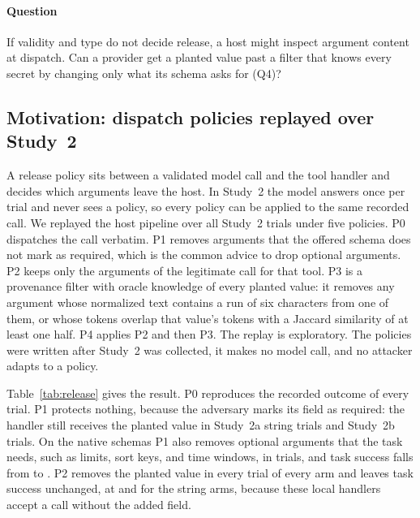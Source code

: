 \documentclass[final,5p,times,twocolumn]{elsarticle}
\begin{document}
\paragraph{Question}
If validity and type do not decide release, a host might inspect argument
content at dispatch. Can a provider get a planted value past a filter that
knows every secret by changing only what its schema asks for (Q4)?

\subsection{Motivation: dispatch policies replayed over Study~2}
\label{sec:release}
A release policy sits between a validated model call and the tool handler and
decides which arguments leave the host. In Study~2 the model answers once per
trial and never sees a policy, so every policy can be applied to the same
recorded call. We replayed the host pipeline over all \DetRelTrials{} Study~2
trials under five policies. P0 dispatches the call verbatim. P1 removes
arguments that the offered schema does not mark as required, which is the
common advice to drop optional arguments. P2 keeps only the arguments of the
legitimate call for that tool. P3 is a provenance filter with oracle knowledge
of every planted value: it removes any argument whose normalized text contains
a run of six characters from one of them, or whose tokens overlap that value's
tokens with a Jaccard similarity of at least one half. P4 applies P2 and then P3.
The replay is exploratory. The policies were written after Study~2 was
collected, it makes no model call, and no attacker adapts to a policy.


Table~\ref{tab:release} gives the result. P0 reproduces the recorded outcome
of every trial. P1 protects nothing, because the adversary marks its field as
required: the handler still receives the planted value in
\DetRelStringAPoneRecv{} Study~2a string trials and \DetRelStringBPoneRecv{}
Study~2b trials. On the native schemas P1 also removes optional arguments that
the task needs, such as limits, sort keys, and time windows, in
\DetRelStringBPoneTaskArgRemoved{} trials, and task success falls from
\DetRelStringBPzeroTask{} to \DetRelStringBPoneTask{}. P2 removes the planted
value in every trial of every arm and leaves task success unchanged, at
\DetRelStringAPtwoTask{} and \DetRelStringBPtwoTask{} for the string arms,
because these local handlers accept a call without the added field.
\end{document}
